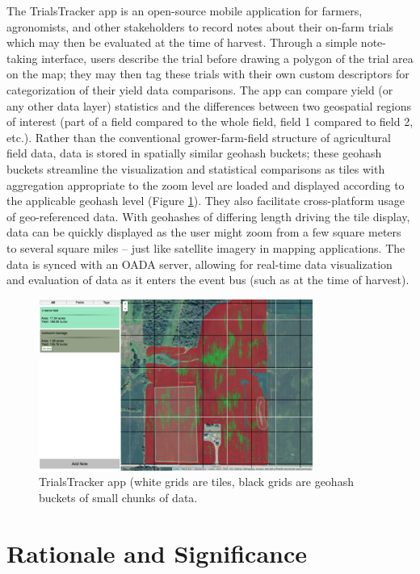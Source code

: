 \documentclass[11pt]{article}
\begin{document}
The TrialsTracker app \cite{TrialsTracker:16} is an open-source mobile application for farmers, agronomists, and 
other stakeholders to record notes about their on-farm trials which may then be evaluated at the time of harvest. 
Through a simple note-taking interface, users describe the trial before drawing a polygon of the trial area on the map; they 
may then tag these trials with their own custom descriptors for categorization of their yield data comparisons.  The app can compare yield 
(or any other data layer) statistics and the differences between two geospatial regions of interest (part of a field compared to the 
whole field, field 1 compared to field 2, etc.). Rather than the conventional grower-farm-field structure of agricultural field data, 
data is stored in spatially similar geohash buckets; these geohash buckets streamline the visualization and statistical 
comparisons as tiles with aggregation appropriate to the zoom level are loaded and displayed according to the 
applicable geohash level (Figure \ref{fg:TrialsTracker}). 
They also facilitate cross-platform usage of geo-referenced data. With geohashes of differing length driving the tile display, 
data can be quickly displayed as the user might zoom from a few square meters to several square miles -- just like 
satellite imagery in mapping applications. The data is synced with an OADA server, allowing for real-time data visualization 
and evaluation of data as it enters the event bus (such as at the time of harvest).

\begin{figure} 
\centerline{
\includegraphics[width = 0.8\textwidth]{TrialsTracker}
}
\caption{TrialsTracker app (white grids are tiles, black grids are geohash buckets of small chunks of data.} 
\label{fg:TrialsTracker}
\end{figure} 
	
\section{Rationale and Significance}
\end{document}
